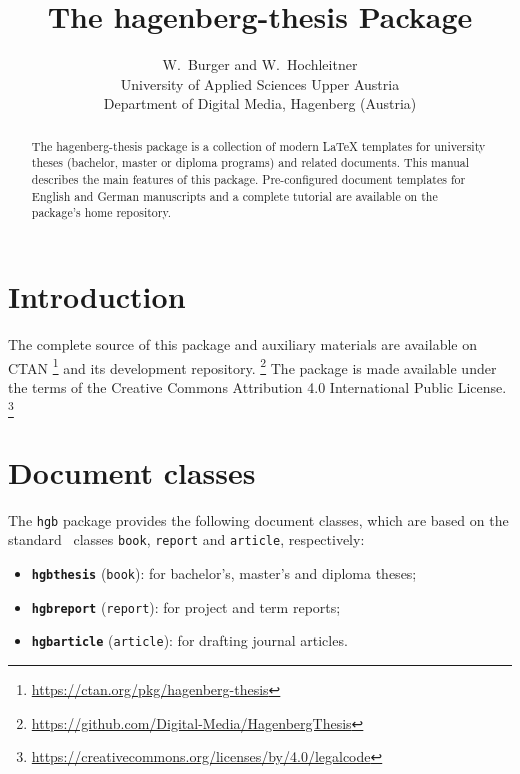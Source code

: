 \documentclass[english]{hgbarticle}
\title{The \textsf{hagenberg-thesis} Package}
\date{\hgbDate}
\author{W.\ Burger and W.\ Hochleitner\\[10pt]
University of Applied Sciences Upper Austria\\
Department of Digital Media, Hagenberg (Austria)}
\begin{document}
\maketitle

\begin{abstract}\noindent
The \textsf{hagenberg-thesis} package is a collection of modern LaTeX
templates for university theses (bachelor, master or diploma programs) and
related documents. This manual describes the main features of this package.
Pre-configured document templates for English and German manuscripts and a
complete tutorial are available on the package's home repository.
\end{abstract}


\section{Introduction}

The complete source of this package and auxiliary materials are available on
CTAN%
\footnote{\url{https://ctan.org/pkg/hagenberg-thesis}}
and its development repository.%
\footnote{\url{https://github.com/Digital-Media/HagenbergThesis}}
The package is made available under the terms of the Creative Commons
Attribution 4.0 International Public License.%
\footnote{\url{https://creativecommons.org/licenses/by/4.0/legalcode}}


\section{Document classes}

The \texttt{hgb} package provides the following document classes, which are
based on the standard \latex\ classes \texttt{book}, \texttt{report} and
\texttt{article}, respectively:
%
\begin{itemize}
    \item \textbf{\texttt{hgbthesis}} (\texttt{book}):
    for bachelor's, master's and diploma theses;
    \item \textbf{\texttt{hgbreport}} (\texttt{report}):
    for project and term reports;
    \item \textbf{\texttt{hgbarticle}} (\texttt{article}):
    for drafting journal articles.
\end{itemize}
\end{document}
